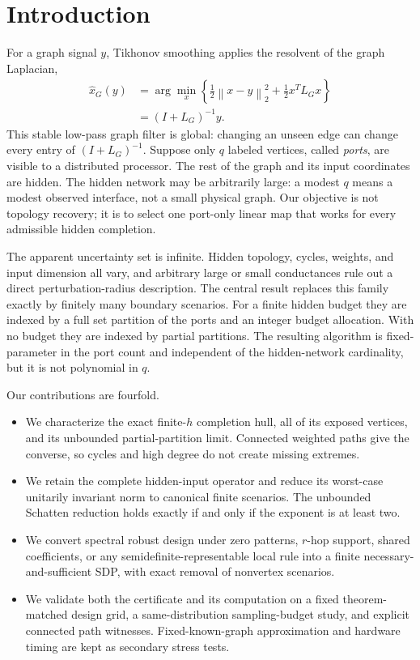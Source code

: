 \documentclass[journal,10pt]{IEEEtran}
\theoremstyle{definition}
\theoremstyle{remark}
\newcommand{\norm}[1]{\left\lVert #1\right\rVert}
\begin{document}
\section{Introduction}

For a graph signal $y$, Tikhonov smoothing applies the resolvent of the graph
Laplacian,
\begin{equation}
\begin{aligned}
 \widehat x_G(y)
 &=\arg\min_x\left\{
     \tfrac12\norm{x-y}_2^2+\tfrac12x^TL_Gx\right\}\\
 &=(I+L_G)^{-1}y.
\end{aligned}
  \label{eq:smoother}
\end{equation}
This stable low-pass graph filter is global: changing an unseen edge can change
every entry of $(I+L_G)^{-1}$.  Suppose only $q$ labeled vertices, called
\emph{ports}, are visible to a distributed processor.  The rest of the graph
and its input coordinates are hidden.  The hidden network may be arbitrarily
large: a modest $q$ means a modest observed interface, not a small physical
graph.  Our objective is not topology recovery; it is to select one port-only
linear map that works for every admissible hidden completion.

The apparent uncertainty set is infinite.  Hidden topology, cycles, weights,
and input dimension all vary, and arbitrary large or small conductances rule
out a direct perturbation-radius description.  The central result replaces
this family exactly by finitely many boundary scenarios.  For a finite hidden
budget they are indexed by a full set partition of the ports and an integer
budget allocation.  With no budget they are indexed by partial partitions.
The resulting algorithm is fixed-parameter in the port count and independent
of the hidden-network cardinality, but it is not polynomial in $q$.

Our contributions are fourfold.
\begin{itemize}[leftmargin=1.45em,itemsep=1pt,topsep=2pt]
\item We characterize the exact finite-$h$ completion hull, all of its exposed
vertices, and its unbounded partial-partition limit.  Connected weighted paths
give the converse, so cycles and high degree do not create missing extremes.
\item We retain the complete hidden-input operator and reduce its worst-case
unitarily invariant norm to canonical finite scenarios.  The unbounded
Schatten reduction holds exactly if and only if the exponent is at least two.
\item We convert spectral robust design under zero patterns, $r$-hop support,
shared coefficients, or any semidefinite-representable local rule into a finite
necessary-and-sufficient SDP, with exact removal of nonvertex scenarios.
\item We validate both the certificate and its computation on a fixed
theorem-matched design grid, a same-distribution sampling-budget study, and
explicit connected path witnesses.  Fixed-known-graph approximation and
hardware timing are kept as secondary stress tests.
\end{itemize}
\end{document}
